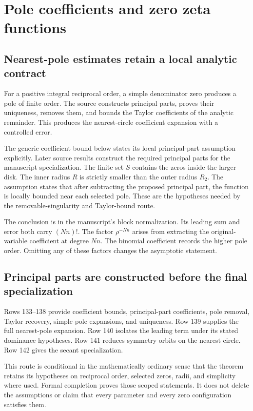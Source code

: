 \section{Pole coefficients and zero zeta functions}
\subsection{Nearest-pole estimates retain a local analytic contract}
For a positive integral reciprocal order, a simple denominator zero produces a pole of finite order. The source constructs principal parts, proves their uniqueness, removes them, and bounds the Taylor coefficients of the analytic remainder. This produces the nearest-circle coefficient expansion with a controlled error.

The generic coefficient bound below states its local principal-part assumption explicitly. Later source results construct the required principal parts for the manuscript specialization.
The finite set $S$ contains the zeros inside the larger disk. The inner radius $R$ is strictly smaller than the outer radius $R_2$. The assumption  states that after subtracting the proposed principal part, the function is locally bounded near each selected pole. These are the hypotheses needed by the removable-singularity and Taylor-bound route.

The conclusion is in the manuscript's block normalization. Its leading sum and error both carry $(Nn)!$. The factor $\rho^{-Nn}$ arises from extracting the original-variable coefficient at degree $Nn$. The binomial coefficient records the higher pole order. Omitting any of these factors changes the asymptotic statement.

\subsection{Principal parts are constructed before the final specialization}
Rows 133--138 provide coefficient bounds, principal-part coefficients, pole removal, Taylor recovery, simple-pole expansions, and uniqueness. Row 139 supplies the full nearest-pole expansion. Row 140 isolates the leading term under its stated dominance hypotheses. Row 141 reduces symmetry orbits on the nearest circle. Row 142 gives the secant specialization.

This route is conditional in the mathematically ordinary sense that the theorem retains its hypotheses on reciprocal order, selected zeros, radii, and simplicity where used. Formal completion proves those scoped statements. It does not delete the assumptions or claim that every parameter and every zero configuration satisfies them.

